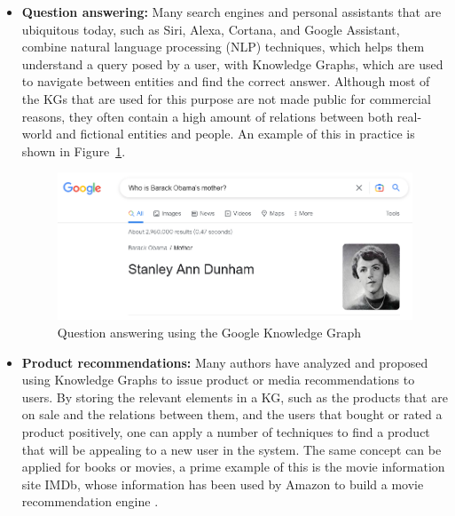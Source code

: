 \begin{itemize}
    \item \textbf{Question answering:} Many search engines and personal assistants that are ubiquitous today, such as Siri, Alexa, Cortana, and Google Assistant, combine natural language processing (NLP) techniques, which helps them understand a query posed by a user, with Knowledge Graphs, which are used to navigate between entities and find the correct answer. Although most of the KGs that are used for this purpose are not made public for commercial reasons, they often contain a high amount of relations between both real-world and fictional entities and people. An example of this in practice is shown in Figure~\ref{fig:kgs-qa}.\\
    
    \begin{figure}[!htp]
        \centering
        \includegraphics[width=\textwidth]{fig/kgs/qa.png}
        \caption{Question answering using the Google Knowledge Graph}
        \label{fig:kgs-qa}
    \end{figure}

    \item \textbf{Product recommendations:} Many authors \cite{zhang2021, palumbo2020, wang2019b, guo2022} have analyzed and proposed using Knowledge Graphs to issue product or media recommendations to users. By storing the relevant elements in a KG, such as the products that are on sale and the relations between them, and the users that bought or rated a product positively, one can apply a number of techniques to find a product that will be appealing to a new user in the system. The same concept can be applied for books or movies, a prime example of this is the movie information site IMDb, whose information has been used by Amazon to build a movie recommendation engine \cite{rele2022}.\newpage
    

\end{itemize}

